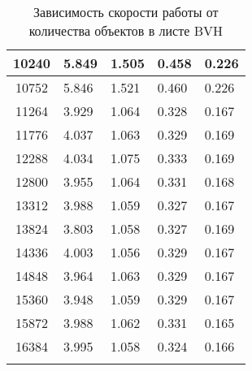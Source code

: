 \begin{center}
\begin{longtable}{|c|p{2cm}|p{2cm}|p{2cm}|p{2cm}|}
\hline 10240 &  5.849 & 1.505 & 0.458 & 0.226 \\ 
\hline 10752 &  5.846 & 1.521 & 0.460 & 0.226 \\ 
\hline 11264 &  3.929 & 1.064 & 0.328 & 0.167 \\ 
\hline 11776 &  4.037 & 1.063 & 0.329 & 0.169 \\ 
\hline 12288 &  4.034 & 1.075 & 0.333 & 0.169 \\ 
\hline 12800 &  3.955 & 1.064 & 0.331 & 0.168 \\ 
\hline 13312 &  3.988 & 1.059 & 0.327 & 0.167 \\ 
\hline 13824 &  3.803 & 1.058 & 0.327 & 0.169 \\ 
\hline 14336 &  4.003 & 1.056 & 0.329 & 0.167 \\ 
\hline 14848 &  3.964 & 1.063 & 0.329 & 0.167 \\ 
\hline 15360 &  3.948 & 1.059 & 0.329 & 0.167 \\ 
\hline 15872 &  3.988 & 1.062 & 0.331 & 0.165 \\ 
\hline 16384 &  3.995 & 1.058 & 0.324 & 0.166 \\ 
\hline
\caption{Зависимость скорости работы от количества объектов в листе BVH}\label{tab:performance_bvh}\end{longtable}
\end{center}

